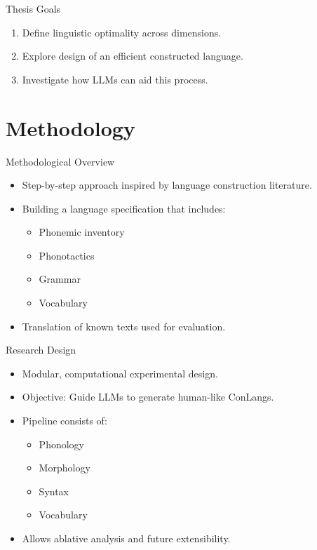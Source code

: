 \documentclass{beamer}
\begin{document}
\begin{frame}{Thesis Goals}
	\begin{enumerate}
		\item Define linguistic optimality across dimensions.
		\item Explore design of an efficient constructed language.
		\item Investigate how LLMs can aid this process.
	\end{enumerate}
\end{frame}

\section{Methodology}

\begin{frame}{Methodological Overview}
	\begin{itemize}
		\item Step-by-step approach inspired by language construction literature.
		\item Building a language specification that includes:
		\begin{itemize}
			\item Phonemic inventory
			\item Phonotactics
			\item Grammar
			\item Vocabulary
		\end{itemize}
		\item Translation of known texts used for evaluation.
	\end{itemize}
\end{frame}

\begin{frame}{Research Design}
	\begin{itemize}
		\item Modular, computational experimental design.
		\item Objective: Guide LLMs to generate human-like ConLangs.
		\item Pipeline consists of:
		\begin{itemize}
			\item Phonology
			\item Morphology
			\item Syntax
			\item Vocabulary
		\end{itemize}
		\item Allows ablative analysis and future extensibility.
	\end{itemize}
\end{frame}
\end{document}
